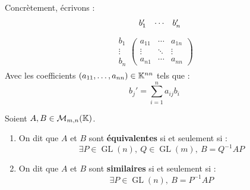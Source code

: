 \par \noindent Concrètement, écrivons : 
\begin{align*}
    \hspace{0.45cm}
    \begin{matrix}
        b_1' & \cdots & b_n' 
    \end{matrix}
\end{align*}
\vspace{-1.1cm}
\begin{align*}
    \begin{matrix}
        b_1 \\
        \vdots \\ 
        b_n
    \end{matrix}
    \begin{pmatrix}
        a_{11} & \cdots & a_{1n} \\
        \vdots & \ddots & \vdots \\ 
        a_{n1} & \cdots & a_{nn}
    \end{pmatrix}
\end{align*}
Avec les coefficients $(a_{11}, \ldots, a_{nn}) \in \mathbb{K}^{nn}$ tels que :
\[ b_j' = \sum_{i=1}^{n} a_{ij} b_i  \]

\begin{definition}
    Soient $A, B \in \mathcal{M}_{m,n}(\mathbb{K})$.
    \begin{enumerate}
        \item On dit que $A$ et $B$ sont \textbf{équivalentes} si et seulement si : 
        \[ \exists P \in \operatorname{GL}(n),\ Q \in \operatorname{GL}(m),\ B = Q^{-1} A P \]
        \item On dit que $A$ et $B$ sont \textbf{similaires} si et seulement si :
        \[ \exists P \in \operatorname{GL}(n),\ B = P^{-1} A P \]
    \end{enumerate}
\end{definition}

